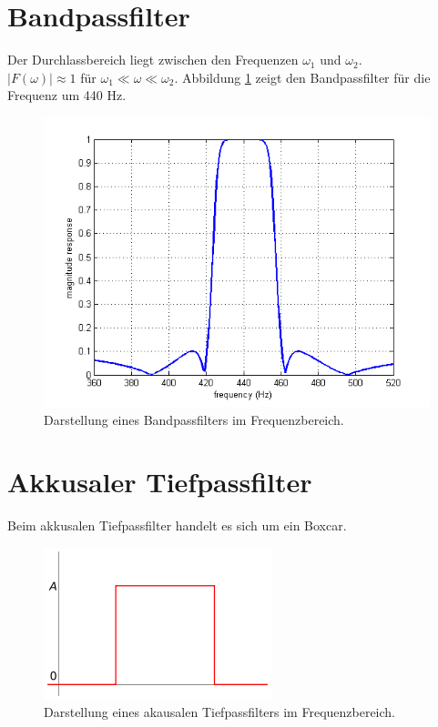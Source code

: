 \section{Bandpassfilter}
Der Durchlassbereich liegt zwischen den Frequenzen $\omega_{1}$ und $\omega_{2}$. \\
$\vert F(\omega) \vert \approx 1 $ für $\omega_{1} \ll\omega \ll\omega_{2}$. Abbildung \ref{fig:filt_bandpass} zeigt den Bandpassfilter für die Frequenz um 440 Hz. 
\begin{figure}[h!]
\centering
\includegraphics[width=.4\tw]{fig/08-Filter/bandpass.png}
\caption{Darstellung eines Bandpassfilters im Frequenzbereich.}
\label{fig:filt_bandpass}
\end{figure}

\section{Akkusaler Tiefpassfilter}
Beim akkusalen Tiefpassfilter handelt es sich um ein Boxcar. 
\begin{figure}[h!]
\centering
\includegraphics[width=.6\tw]{fig/08-Filter/boxcar.png}
\caption{Darstellung eines akausalen Tiefpassfilters im Frequenzbereich.}
\end{figure}
